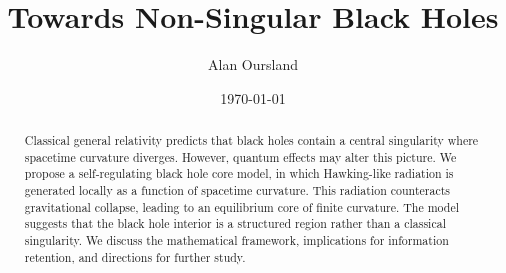 \documentclass[12pt]{article}
\title{Towards Non-Singular Black Holes}
\author{Alan Oursland}
\date{\today}
\begin{document}
\maketitle

\begin{abstract}
Classical general relativity predicts that black holes contain a central singularity where spacetime curvature diverges. However, quantum effects may alter this picture. We propose a self-regulating black hole core model, in which Hawking-like radiation is generated locally as a function of spacetime curvature. This radiation counteracts gravitational collapse, leading to an equilibrium core of finite curvature. The model suggests that the black hole interior is a structured region rather than a classical singularity. We discuss the mathematical framework, implications for information retention, and directions for further study.
\end{abstract}





% 


% 










\end{document}
